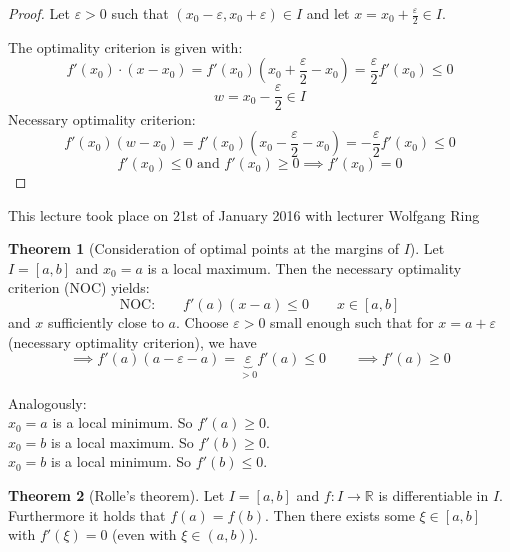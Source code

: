 \documentclass[a4paper,landscape,twocolumn]{article}
\theoremstyle{definition}
\newtheorem{theorem}{Theorem}
\newcommand\meta[3]{\begin{mdframed}[skipbelow=4pt,skipabove=4pt,innermargin=1pt,innerleftmargin=1pt,innerrightmargin=1pt]\begin{center}\small{\textdownarrow{} This #1 took place on #2 with lecturer #3}\end{center}\end{mdframed}}
\begin{document}
%
\begin{proof}
  Let $\varepsilon > 0$ such that $(x_0 - \varepsilon, x_0 + \varepsilon) \in I$
  and let $x = x_0 + \frac\varepsilon{2} \in I$.

  The optimality criterion is given with:
  \[ f'(x_0) \cdot (x - x_0) = f'(x_0) \left(x_0 + \frac\varepsilon{2} - x_0\right) = \frac\varepsilon2 f'(x_0) \leq 0 \]
  \[ w = x_0 - \frac\varepsilon2 \in I \]
  Necessary optimality criterion:
  \[
    f'(x_0)(w - x_0) = f'(x_0)\left(x_0 - \frac\varepsilon2 - x_0\right)
    = -\frac{\varepsilon}{2} f'(x_0) \leq 0
  \] \[
    f'(x_0) \leq 0 \text{ and } f'(x_0) \geq 0 \implies f'(x_0) = 0
  \]
\end{proof}

\meta{lecture}{21st of January 2016}{Wolfgang Ring}

\begin{theorem}[Consideration of optimal points at the margins of $I$]
  Let $I = [a, b]$ and $x_0 = a$ is a local maximum. Then the necessary
  optimality criterion (NOC) yields:
  \[ \text{NOC:} \qquad f'(a) (x - a) \leq 0 \qquad x \in [a,b] \]
  and $x$ sufficiently close to $a$. Choose $\varepsilon > 0$ small enough
  such that for $x = a + \varepsilon$ (necessary optimality criterion), we have
  \[ \implies f'(a) (a - \varepsilon - a) = \underbrace{\varepsilon}_{>0} f'(a) \leq 0
     \qquad \implies f'(a) \geq 0 \]

  Analogously: \\
  $x_0 = a$ is a local minimum. So $f'(a) \geq 0$. \\
  $x_0 = b$ is a local maximum. So $f'(b) \geq 0$. \\
  $x_0 = b$ is a local minimum. So $f'(b) \leq 0$.
\end{theorem}


\begin{theorem}[Rolle's theorem]
  Let $I = [a,b]$ and $f: I \to \mathbb R$ is differentiable in $I$. Furthermore
  it holds that $f(a) = f(b)$. Then there exists some $\xi \in [a,b]$ with
  $f'(\xi) = 0$ (even with $\xi \in (a,b)$).
\end{theorem}
\end{document}
